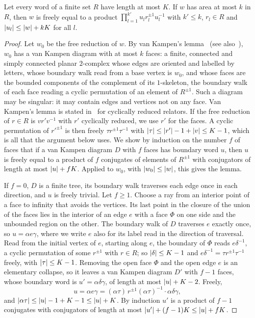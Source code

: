 \begin{lemma}\label{lem:conjugator-length}
Let every word of a finite set $R$ have length at most $K$. If $w$ has area at most $k$ in $R$, then $w$ is freely equal to a product
$\prod_{l=1}^{k'}u_lr_l^{\pm1}u_l^{-1}$ with $k'\le k$, $r_l\in R$ and $\lvert u_l\rvert\le\lvert w\rvert+kK$ for all $l$.
\end{lemma}

\begin{proof}
Let $w_0$ be the free reduction of $w$. By van Kampen's lemma~\cite[Chapter~V, Theorem~1.1]{LS77} (see also~\cite[Section~4]{Bri02}),
$w_0$ has a van Kampen diagram with at most $k$ faces: a finite, connected and simply connected planar $2$-complex whose edges are
oriented and labelled by letters, whose boundary walk read from a base vertex is $w_0$, and whose faces are the bounded components of the
complement of its $1$-skeleton, the boundary walk of each face reading a cyclic permutation of an element of $R^{\pm1}$. Such a diagram may
be singular: it may contain edges and vertices not on any face. Van Kampen's lemma is stated in~\cite{LS77} for cyclically reduced
relators. If the free reduction of $r\in R$ is $vr'v^{-1}$ with $r'$ cyclically reduced, we use $r'$ for the faces. A cyclic permutation of
$r'^{\pm1}$ is then freely $\tau r^{\pm1}\tau^{-1}$ with $\lvert \tau\rvert\le\lvert r'\rvert-1+\lvert v\rvert\le K-1$, which is all that the argument below uses. We show by induction on the number $f$ of faces that if a van Kampen
diagram $D$ with $f$ faces has boundary word $u$, then $u$ is freely equal to a product of $f$ conjugates of elements of $R^{\pm1}$ with
conjugators of length at most $\lvert u\rvert+fK$. Applied to $w_0$, with $\lvert w_0\rvert\le\lvert w\rvert$, this gives the lemma.

If $f=0$, $D$ is a finite tree, its boundary walk traverses each edge once in each direction, and $u$ is freely trivial. Let $f\ge1$.
Choose a ray from an interior point of a face to infinity that avoids the vertices. Its last point in the closure of the union of the
faces lies in the interior of an edge $e$ with a face $\Phi$ on one side and the unbounded region on the other. The boundary walk of $D$
traverses $e$ exactly once, so $u=\alpha e\gamma$, where we write $e$ also for its label read in the direction of traversal. Read from
the initial vertex of $e$, starting along $e$, the boundary of $\Phi$ reads $e\delta^{-1}$, a cyclic permutation of some $r^{\pm1}$ with
$r\in R$; so $\lvert \delta\rvert\le K-1$ and $e\delta^{-1}=\tau r^{\pm1}\tau^{-1}$ freely, with $\lvert \tau\rvert\le K-1$. Removing the open face
$\Phi$ and the open edge $e$ is an elementary collapse, so it leaves a van Kampen diagram $D'$ with $f-1$ faces, whose boundary word is
$u'=\alpha\delta\gamma$, of length at most $\lvert u\rvert+K-2$. Freely,
\[
u=\alpha e\gamma=(\alpha\tau)\,r^{\pm1}(\alpha\tau)^{-1}\cdot\alpha\delta\gamma ,
\]
and $\lvert \alpha\tau\rvert\le\lvert u\rvert-1+K-1\le\lvert u\rvert+K$. By induction $u'$ is a product of $f-1$ conjugates with conjugators of length at most
$\lvert u'\rvert+(f-1)K\le\lvert u\rvert+fK$.
\end{proof}

